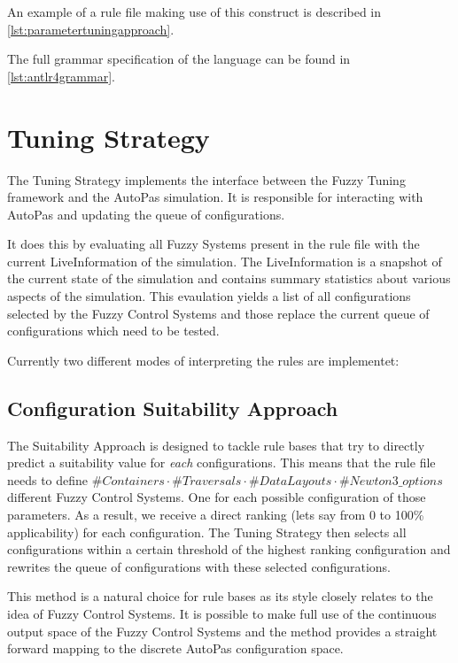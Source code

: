 
An example of a rule file making use of this construct is described in \autoref{lst:parametertuningapproach}.

The full grammar specification of the language can be found in \autoref{lst:antlr4grammar}.

\section{Tuning Strategy}

The Tuning Strategy implements the interface between the Fuzzy Tuning framework and the AutoPas simulation. It is responsible for interacting with AutoPas and updating the queue of configurations.

It does this by evaluating all Fuzzy Systems present in the rule file with the current LiveInformation of the simulation. The LiveInformation is a snapshot of the current state of the simulation and contains summary statistics about various aspects of the simulation. This evaulation yields a list of all configurations selected by the Fuzzy Control Systems and those replace the current queue of configurations which need to be tested.


Currently two different modes of interpreting the rules are implementet:

\subsection{Configuration Suitability Approach}

The Suitability Approach is designed to tackle rule bases that try to directly predict a suitability value for \emph{each} configurations. This means that the rule file needs to define $\#Containers \cdot \#Traversals \cdot \#DataLayouts \cdot \#Newton3\_options$ different Fuzzy Control Systems. One for each possible configuration of those parameters. As a result, we receive a direct ranking (lets say from 0 to 100\% applicability) for each configuration. The Tuning Strategy then selects all configurations within a certain threshold of the highest ranking configuration and rewrites the queue of configurations with these selected configurations.

This method is a natural choice for rule bases as its style closely relates to the idea of Fuzzy Control Systems. It is possible to make full use of the continuous output space of the Fuzzy Control Systems and the method provides a straight forward mapping to the discrete AutoPas configuration space.


